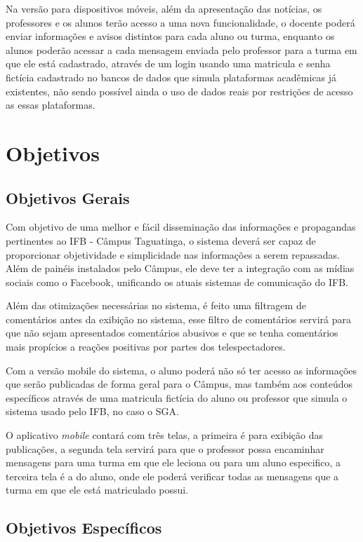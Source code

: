 Na versão para dispositivos móveis, além da apresentação das notícias, os professores e os alunos terão acesso a uma nova funcionalidade, o docente poderá enviar informações e avisos distintos para cada aluno ou turma, enquanto os alunos poderão acessar a cada mensagem enviada pelo professor para a turma em que ele está cadastrado, através de um login usando uma matricula e senha fictícia cadastrado no bancos de dados que simula plataformas acadêmicas já existentes, não sendo possível ainda o uso de dados reais por restrições de acesso as essas plataformas.

\section{Objetivos}
\subsection{Objetivos Gerais}
Com objetivo de uma melhor e fácil disseminação das informações e propagandas pertinentes ao IFB - Câmpus Taguatinga, o sistema deverá ser capaz de proporcionar objetividade e simplicidade nas informações a serem repassadas. Além de painéis instalados pelo Câmpus, ele deve ter a integração com as mídias sociais como o Facebook, unificando os atuais sistemas de comunicação do IFB.

Além das otimizações necessárias no sistema, é feito uma filtragem de comentários antes da exibição no sistema, esse filtro de comentários servirá para que não sejam apresentados comentários abusivos e que se tenha comentários mais propícios a reações positivas por partes dos telespectadores.

Com a versão mobile do sistema, o aluno poderá não só ter acesso as informações que serão publicadas de forma geral para o Câmpus, mas também aos conteúdos específicos através de uma matricula fictícia do aluno ou professor que simula o sistema usado pelo IFB, no caso o SGA. 

O aplicativo \textit{mobile} contará com três telas, a primeira é para exibição das publicações, a segunda tela servirá para que o professor possa encaminhar mensagens para uma turma em que ele leciona ou para um aluno especifico, a terceira tela é a do aluno, onde ele poderá verificar todas as mensagens que a turma em que ele está matriculado possui.

\subsection{Objetivos Específicos}

